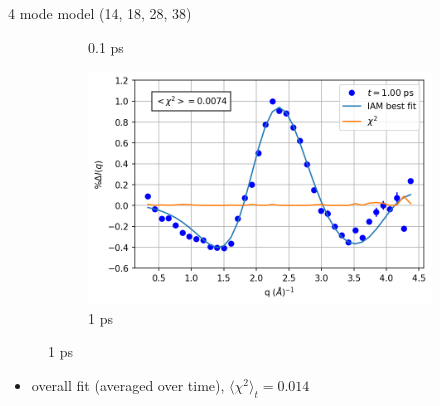 \documentclass{beamer}
\newcommand\w{0.32}
\begin{document}
\begin{frame}{4 mode model (14, 18, 28, 38)}
\begin{figure}
\begin{subfigure}[b]{\w\textwidth}
			\caption{0.1 ps}
		\end{subfigure}
		\begin{subfigure}[b]{\w\textwidth}
			\centering
			\includegraphics[width=\textwidth]{figures/10000_vstrongmodes_1.00.png}
			\caption{1 ps}
		\end{subfigure}
	\end{figure}
\begin{itemize}
	\item overall fit (averaged over time), $\langle\chi^2\rangle_t = 0.014$
\end{itemize}
\end{frame}
\end{document}
